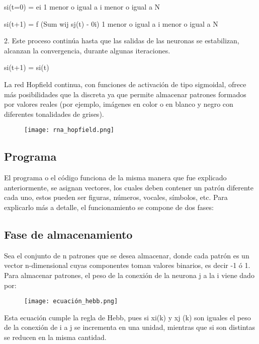 \documentclass[12pt]{article}
\begin{document}
\begin{center}
si(t=0) = ei 1 menor o igual a i menor o igual a N

si(t+1) = f (Sum wij sj(t) - 0i) 1 menor o igual a i menor o igual a N
\end{center}
		
2.	Este proceso continúa hasta que las salidas de las neuronas se estabilizan, alcanzan la convergencia, durante algunas iteraciones.

\begin{center}
    si(t+1) = si(t)
\end{center}

La red Hopfield continua, con funciones de activación de tipo sigmoidal, ofrece más posibilidades que la discreta ya que permite almacenar patrones formados por valores reales (por ejemplo, imágenes en color o en blanco y negro con diferentes tonalidades de grises).

\begin{figure}[h]
\centering
\texttt{[image: rna\_hopfield.png]}
\end{figure}

\subsection*{\LARGE{Programa}}

El programa o el código funciona de la misma manera que fue explicado anteriormente, se asignan vectores, los cuales deben contener un patrón diferente cada uno, estos pueden ser figuras, números, vocales, símbolos, etc. Para explicarlo más a detalle, el funcionamiento se compone de dos fases:

\subsection*{\large{Fase de almacenamiento}}

Sea el conjunto de n patrones que se desea almacenar, donde cada patrón es un vector n-dimensional cuyas componentes toman valores binarios, es decir -1 ó 1. Para almacenar patrones, el peso de la conexión de la neurona j a la i viene dado por: 

\pagebreak

\begin{figure}[h]
\centering
\texttt{[image: ecuación\_hebb.png]}
\end{figure}

Esta ecuación cumple la regla de Hebb, pues si xi(k) y xj (k) son iguales el peso de la conexión de i a j se incrementa en una unidad, mientras que si son distintas se reducen en la misma cantidad.
\end{document}
